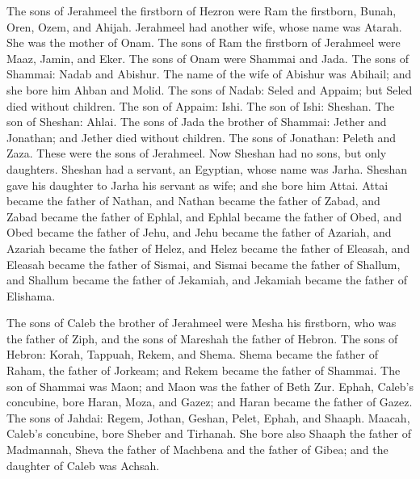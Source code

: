  The sons of Jerahmeel the firstborn of Hezron were Ram
the firstborn, Bunah, Oren, Ozem, and Ahijah.  Jerahmeel
had another wife, whose name was Atarah. She was the mother of Onam.
 The sons of Ram the firstborn of Jerahmeel were Maaz,
Jamin, and Eker.  The sons of Onam were Shammai and Jada.
The sons of Shammai: Nadab and Abishur.  The name of the
wife of Abishur was Abihail; and she bore him Ahban and Molid.
 The sons of Nadab: Seled and Appaim; but Seled died
without children.  The son of Appaim: Ishi. The son of
Ishi: Sheshan. The son of Sheshan: Ahlai.  The sons of
Jada the brother of Shammai: Jether and Jonathan; and Jether died
without children.  The sons of Jonathan: Peleth and Zaza.
These were the sons of Jerahmeel.  Now Sheshan had no
sons, but only daughters. Sheshan had a servant, an Egyptian, whose name
was Jarha.  Sheshan gave his daughter to Jarha his
servant as wife; and she bore him Attai.  Attai became
the father of Nathan, and Nathan became the father of Zabad,
 and Zabad became the father of Ephlal, and Ephlal became
the father of Obed,  and Obed became the father of Jehu,
and Jehu became the father of Azariah,  and Azariah
became the father of Helez, and Helez became the father of Eleasah,
 and Eleasah became the father of Sismai, and Sismai
became the father of Shallum,  and Shallum became the
father of Jekamiah, and Jekamiah became the father of Elishama.

 The sons of Caleb the brother of Jerahmeel were Mesha
his firstborn, who was the father of Ziph, and the sons of Mareshah the
father of Hebron.  The sons of Hebron: Korah, Tappuah,
Rekem, and Shema.  Shema became the father of Raham, the
father of Jorkeam; and Rekem became the father of Shammai.
 The son of Shammai was Maon; and Maon was the father of
Beth Zur.  Ephah, Caleb's concubine, bore Haran, Moza,
and Gazez; and Haran became the father of Gazez.  The
sons of Jahdai: Regem, Jothan, Geshan, Pelet, Ephah, and Shaaph.
 Maacah, Caleb's concubine, bore Sheber and Tirhanah.
 She bore also Shaaph the father of Madmannah, Sheva the
father of Machbena and the father of Gibea; and the daughter of Caleb
was Achsah.

